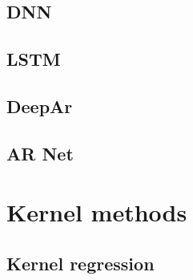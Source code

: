 \subsection{DNN}
\subsection{LSTM}
\subsection{DeepAr}
\subsection{AR Net}

\section{Kernel methods}
\subsection{Kernel regression}

